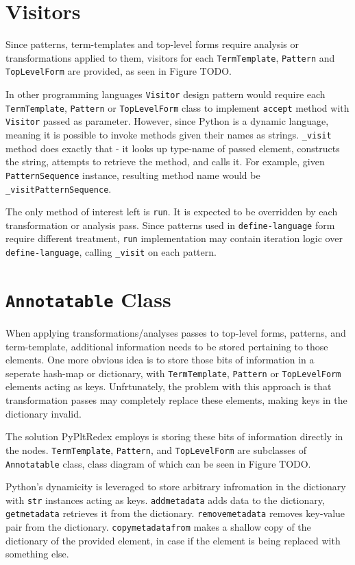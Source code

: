 \section{Visitors}
Since patterns, term-templates and top-level forms require analysis or transformations applied to them, visitors for each \texttt{TermTemplate}, \texttt{Pattern} and \texttt{TopLevelForm} are provided, as seen in Figure TODO. 

In other programming languages \texttt{Visitor} design pattern would require each \texttt{TermTemplate}, \texttt{Pattern} or \texttt{TopLevelForm} class to implement \texttt{accept} method with \texttt{Visitor} passed as parameter. However, since Python is a dynamic language, meaning it is possible to invoke methods given their names as strings. \texttt{\_visit} method does exactly that - it looks up type-name of passed element, constructs the string, attempts to retrieve the method, and calls it. For example, given \texttt{PatternSequence} instance, resulting method name would be \texttt{\_visitPatternSequence}.

The only method of interest left is \texttt{run}. It is expected to be overridden by each transformation or analysis pass.  Since patterns used in \texttt{define-language} form require different treatment, \texttt{run} implementation may contain iteration logic over \texttt{define-language}, calling \texttt{\_visit} on each pattern. 

\section{\texttt{Annotatable} Class}

When applying transformations/analyses passes to top-level forms, patterns, and term-template, additional information needs to be stored pertaining to those elements. One more obvious idea is to store those bits of information in a seperate hash-map or dictionary, with \texttt{TermTemplate}, \texttt{Pattern} or \texttt{TopLevelForm} elements acting as keys. Unfrtunately, the problem with this approach is that transformation passes may completely replace these elements, making keys in the dictionary invalid.

The solution PyPltRedex employs is storing these bits of information directly in the nodes. \texttt{TermTemplate}, \texttt{Pattern}, and \texttt{TopLevelForm} are subclasses of \texttt{Annotatable} class, class diagram of which can be seen in Figure TODO.

Python's dynamicity is leveraged to store arbitrary infromation in the dictionary with \texttt{str} instances acting as keys. \texttt{addmetadata} adds data to the dictionary, \texttt{getmetadata} retrieves it from the dictionary. \texttt{removemetadata} removes key-value pair from the dictionary. \texttt{copymetadatafrom} makes a shallow copy of the dictionary of the provided element, in case if the element is being replaced with something else.

